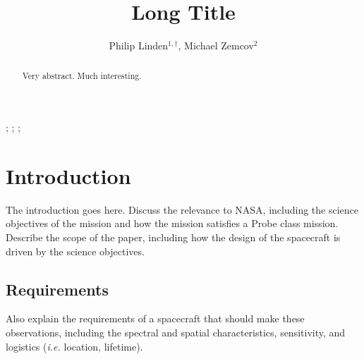 \documentclass{ws-jai}
\begin{document}
\catchline{}{}{}{}{} %


\title{Long Title}

\author{Philip Linden$^{1,\dagger}$, Michael Zemcov$^{2}$}

\address{
$^1$Department of Mechanical Engineering, Kate Gleason College of Engineering, Rochester
Institute of Technology, Rochester, NY 14623, USA, pjl7651@rit.edu\\
$^1$Center for Detectors, School of Physics and Astronomy, Rochester
Institute of Technology, Rochester, NY 14623, USA, zemcov@cfd.rit.edu\\
}

\maketitle


\begin{history}
;
;
;
\end{history}

\begin{abstract}
  Very abstract.
  Much interesting.
\end{abstract}


\section{Introduction}
\label{S:introduction}
The introduction goes here.
%
Discuss the relevance to NASA, including the science objectives of the mission and how the mission satisfies a Probe class mission.
%
Describe the scope of the paper, including how the design of the spacecraft is driven by the science objectives.

\subsection{Requirements}
\label{sS:requirements}
Also explain the requirements of a spacecraft that should make these observations, including the spectral and spatial characteristics, sensitivity, and logistics (\textit{i.e.} location, lifetime).
\end{document}

